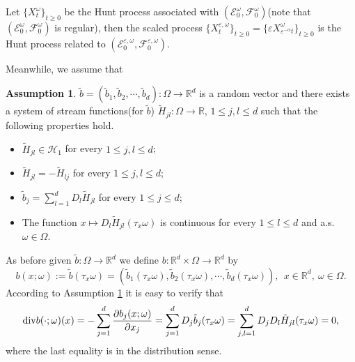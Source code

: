\documentclass[11pt,draft, reqno]{amsart}
\renewcommand{\le}{\leqslant}
\renewcommand{\ge}{\geqslant}
\def\EE{{\mathcal E}}
\def\FF{{\mathcal F}}
\newcommand{\HH}{\mathcal{H}}
\newcommand{\R}{\mathds R}
\newcommand{\e}{\varepsilon}
\newcommand{\w}{\omega}
\theoremstyle{definition}
\newtheorem{assumption}[theorem]{Assumption}
\numberwithin{equation}{section}
\begin{document}
Let $\{X_t^\w\}_{t\ge 0}$ be the Hunt process associated with $(\EE_0^\w,\FF_0^\w)$(note that $(\EE_0^\w,\FF_0^\w)$ is regular), then
the scaled process $\{X_t^{\e,\w}\}_{t\ge 0}=\{\e X^{\w}_{\e^{-\alpha}t}\}_{t\ge 0}$ is the Hunt process related to
$(\EE_0^{\e,\w},\FF_0^{\e,\w})$.

Meanwhile, we assume that
\begin{assumption}\label{a1-2}
$\tilde b=(\tilde b_1,\tilde b_2,\cdots, \tilde b_d):\Omega \to \R^d$ is a random vector
and there exists a system of stream functions(for $\tilde b$) $\tilde H_{jl}:\Omega \to \R$, $1\le j,l\le d$ such that
the following properties hold.
\begin{itemize}
\item [(i)] $\tilde H_{jl}\in \HH_{1}$ for every $1\le j,l \le d$;

\item [(ii)] $\tilde H_{jl}=-\tilde H_{lj}$ for every $1\le j,l \le d$;

\item [(iii)] $\tilde b_j=\sum_{l=1}^d D_l \tilde H_{jl}$ for every $1\le j \le d$;

\item [(iv)] The function $x\mapsto D_l \tilde H_{jl}(\tau_x \w)$ is continuous for every $1\le l \le d$ and a.s. $\w\in \Omega$.
\end{itemize}
\end{assumption}
As before given $\tilde b:\Omega \to \R^d$ we define $b:\R^d\times \Omega \to \R^d$ by
\begin{equation*}
b(x;\w):=\tilde b(\tau_x \w)=\left(\tilde b_1(\tau_x \w), \tilde b_2(\tau_x \w),\cdots, \tilde b_d(\tau_x \w)\right),\ \ x\in \R^d,\ \w\in \Omega.
\end{equation*}
According to Assumption \ref{a1-2} it is easy to verify that
\begin{equation}\label{e1-5}
{\rm div}b(\cdot;\w)(x)=-\sum_{j=1}^d \frac{\partial b_j(x;\w)}{\partial x_j}=\sum_{j=1}^d D_j \tilde b_j(\tau_x \w)=
\sum_{j,l=1}^d D_jD_l \tilde H_{jl}(\tau_x\w)=0,
\end{equation}
where the last equality is in the distribution sense.
\end{document}
